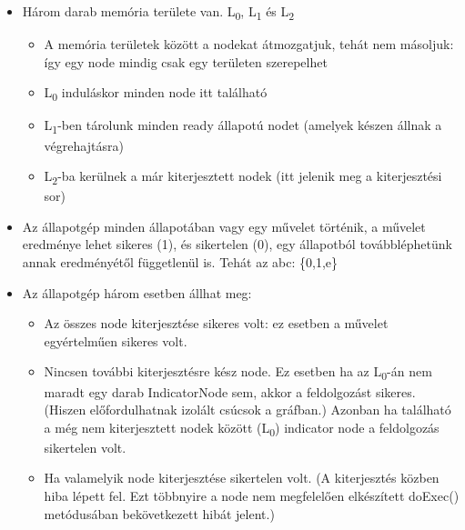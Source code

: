 \documentclass[a4paper,12pt,oneside]{report}
\begin{document}
\begin{itemize}
	\itemsep0em
	\item Három darab memória területe van. L\textsubscript{0}, L\textsubscript{1} és L\textsubscript{2} 			\begin{itemize}
			\itemsep0em
			\item A memória területek között a nodekat átmozgatjuk, tehát nem másoljuk: így egy node mindig csak egy területen szerepelhet
			\item L\textsubscript{0} induláskor minden node itt található
			\item L\textsubscript{1}-ben tárolunk minden ready állapotú nodet (amelyek készen állnak a végrehajtásra)
			\item L\textsubscript{2}-ba kerülnek a már kiterjesztett nodek (itt jelenik meg a kiterjesztési sor)
		\end{itemize}
		
	\item Az állapotgép minden állapotában vagy egy művelet történik, a művelet eredménye lehet sikeres (1), és sikertelen (0), egy állapotból továbbléphetünk annak eredményétől függetlenül is. Tehát az abc: \{0,1,e\}
	\item Az állapotgép három esetben állhat meg:
			\begin{itemize}
			\itemsep0em
			\item Az összes node kiterjesztése sikeres volt: ez esetben a művelet egyértelműen sikeres volt.
			\item Nincsen további kiterjesztésre kész node. Ez esetben ha az L\textsubscript{0}-án nem maradt egy darab IndicatorNode sem, akkor a feldolgozást sikeres. (Hiszen előfordulhatnak izolált csúcsok a gráfban.) Azonban ha található a még nem kiterjesztett nodek között (L\textsubscript{0}) indicator node a feldolgozás sikertelen volt.
			\item Ha valamelyik node kiterjesztése sikertelen volt. (A kiterjesztés közben hiba lépett fel. Ezt többnyire a node nem megfelelően elkészített doExec() metódusában bekövetkezett hibát jelent.)

		\end{itemize}

\end{itemize}
\end{document}
